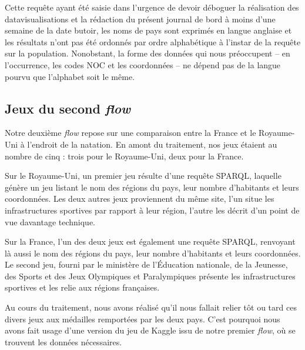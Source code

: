 \documentclass[hidelinks, 12pt]{article}
\begin{document}
Cette requête ayant été saisie dans l'urgence de devoir déboguer la réalisation des datavisualisations et la rédaction du présent journal de bord à moins d'une semaine de la date butoir, les noms de pays sont exprimés en langue anglaise et les résultats n'ont pas été ordonnés par ordre alphabétique à l'instar de la requête sur la population. Nonobstant, la forme des données qui nous préoccupent -- en l'occurrence, les codes NOC et les coordonnées -- ne dépend pas de la langue pourvu que l'alphabet soit le même.





%





\subsection{Jeux du second \emph{flow}}

Notre deuxième \textit{flow} repose sur une comparaison entre la France et le Royaume-Uni à l'endroit de la natation. En amont du traitement, nos jeux étaient au nombre de cinq : trois pour le Royaume-Uni, deux pour la France.

Sur le Royaume-Uni, un premier jeu résulte d'une requête SPARQL, laquelle génère un jeu listant le nom des régions du pays, leur nombre d'habitants et leurs coordonnées. Les deux autres jeux proviennent du même site\autocite{ru}, l'un situe les infrastructures sportives par rapport à leur région, l'autre les décrit d'un point de vue davantage technique. 

Sur la France, l'un des deux jeux est également une requête SPARQL, renvoyant là aussi le nom des régions du pays, leur nombre d'habitants et leurs coordonnées. Le second jeu, fourni par le ministère de l'Éducation nationale, de la Jeunesse, des Sports et des Jeux Olympiques et Paralympiques\autocite{ministere} présente les infrastructures sportives et les relie aux régions françaises.

Au cours du traitement, nous avons réalisé qu'il nous fallait relier tôt ou tard ces divers jeux aux médailles remportées par les deux pays. C'est pourquoi nous avons fait usage d'une version du jeu de Kaggle issu de notre premier \textit{flow}, où se trouvent les données nécessaires.





%
\end{document}
